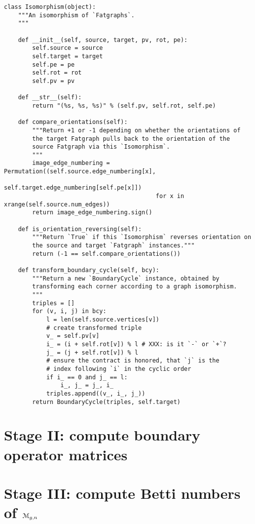 \begin{lstlisting}
class Isomorphism(object):
    """An isomorphism of `Fatgraphs`.
    """

    def __init__(self, source, target, pv, rot, pe):
        self.source = source
        self.target = target
        self.pe = pe
        self.rot = rot
        self.pv = pv

    def __str__(self):
        return "(%s, %s, %s)" % (self.pv, self.rot, self.pe)

    def compare_orientations(self):
        """Return +1 or -1 depending on whether the orientations of
        the target Fatgraph pulls back to the orientation of the
        source Fatgraph via this `Isomorphism`.
        """
        image_edge_numbering = Permutation((self.source.edge_numbering[x],
                                            self.target.edge_numbering[self.pe[x]])
                                           for x in xrange(self.source.num_edges))
        return image_edge_numbering.sign()

    def is_orientation_reversing(self):
        """Return `True` if this `Isomorphism` reverses orientation on
        the source and target `Fatgraph` instances."""
        return (-1 == self.compare_orientations())

    def transform_boundary_cycle(self, bcy):
        """Return a new `BoundaryCycle` instance, obtained by
        transforming each corner according to a graph isomorphism.
        """
        triples = []
        for (v, i, j) in bcy:
            l = len(self.source.vertices[v])
            # create transformed triple 
            v_ = self.pv[v]
            i_ = (i + self.rot[v]) % l # XXX: is it `-` or `+`?
            j_ = (j + self.rot[v]) % l
            # ensure the contract is honored, that `j` is the
            # index following `i` in the cyclic order
            if i_ == 0 and j_ == l:
                i_, j_ = j_, i_
            triples.append((v_, i_, j_))
        return BoundaryCycle(triples, self.target)
\end{lstlisting}



\section[Stage II]{Stage II: compute boundary operator matrices}
\label{sec:stage-ii}

\section[Stage III]{Stage III: compute Betti numbers of $\mathcal{M}_{g,n}$}
\label{sec:stage-iii}



